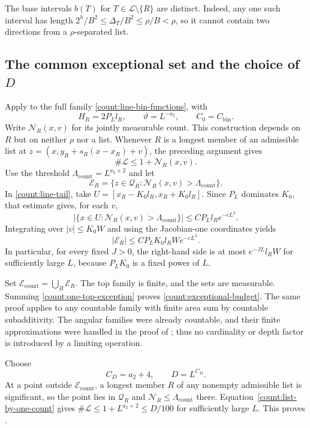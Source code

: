 The base intervals $b(T)$ for $T\in\mathcal L\setminus\{R\}$
are distinct.  Indeed, any one such interval has length
$2^h/B^2\leq\Delta_T/B^2\leq\rho/B<\rho$, so it cannot
contain two directions from a $\rho$-separated list.

\subsection{The common exceptional set and the choice of \texorpdfstring{$D$}{D}}

Apply  to the full family
\eqref{count:line-bin-functions}, with
\[
 H_R=2P_Ll_R,\qquad \vartheta=L^{-a_2},\qquad
 C_0=C_{\mathrm{bin}}.
\]
Write $\mathcal N_R(x,v)$ for its jointly measurable count.
This construction depends on $R$ but on neither $\rho$ nor a
list.  Whenever $R$ is a longest member of an admissible list
at $z=(x,y_R+s_R(x-x_R)+v)$, the preceding argument gives
\begin{equation}\label{count:list-by-one-count}
 \#\mathcal L\leq1+\mathcal N_R(x,v).
\end{equation}
Use the threshold $\Lambda_{\mathrm{count}}=L^{a_2+2}$ and let
\[
 \mathcal E_R=
 \{z\in\mathcal Q_R:
              \mathcal N_R(x,v)>\Lambda_{\mathrm{count}}\}.
\]
In \eqref{count:line-tail}, take
$U=[x_R-K_0l_R,x_R+K_0l_R]$.  Since $P_L$ dominates $K_0$,
that estimate gives, for each $v$,
\[
 |\{x\in U:\mathcal N_R(x,v)>
                         \Lambda_{\mathrm{count}}\}|
 \leq CP_Ll_R e^{-cL^2}.
\]
Integrating over $|v|\leq K_0W$ and using the Jacobian-one
coordinates yields
\begin{equation}\label{count:one-top-exception}
 |\mathcal E_R|\leq CP_LK_0l_RW e^{-cL^2}.
\end{equation}
In particular, for every fixed $J>0$, the right-hand side is
at most $e^{-JL}l_RW$ for sufficiently
large $L$, because $P_LK_0$ is a fixed power of $L$.

Set $\mathcal E_{\mathrm{count}}=\bigcup_R\mathcal E_R$.
The top family is finite, and the sets are measurable.  Summing
\eqref{count:one-top-exception} proves
\eqref{count:exceptional-budget}.  The same proof applies to
any countable family with finite area sum by countable
subadditivity.  The angular families were already countable,
and their finite approximations were handled in the proof of
; thus no cardinality or depth factor is
introduced by a limiting operation.

Choose
\begin{equation}\label{count:choice-D}
 C_D=a_2+4,\qquad D=L^{C_D}.
\end{equation}
At a point outside $\mathcal E_{\mathrm{count}}$, a longest
member $R$ of any nonempty admissible list is significant, so
the point lies in $\mathcal Q_R$ and
$\mathcal N_R\leq\Lambda_{\mathrm{count}}$ there.
Equation~\eqref{count:list-by-one-count} gives
$\#\mathcal L\leq1+L^{a_2+2}\leq D/100$ for sufficiently
large $L$.  This proves .

